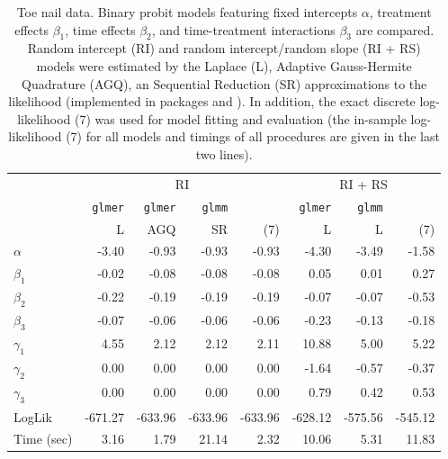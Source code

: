 \documentclass[article,nojss,shortnames]{jss}\usepackage[]{graphicx}\usepackage[]{xcolor}
\newcommand{\eshiftparm}{\beta}
\begin{document}
\begin{table}
\begin{center}


\begin{tabular}{lrrrr|rrr} \\ \hline
& \multicolumn{4}{c|}{RI} & \multicolumn{3}{c}{RI + RS} \\
& \texttt{glmer} & \texttt{glmer} & \texttt{glmm} &  & \texttt{glmer} & \texttt{glmm} & \\
& L               & AGQ             & SR & (7) & L & L & (7) \\ \hline
$\alpha$ & -3.40 & -0.93 & -0.93 & -0.93 & -4.30 & -3.49 & -1.58
\\
$\eshiftparm_1$ & -0.02 & -0.08 & -0.08 & -0.08 &  0.05 &  0.01 &  0.27
\\
$\eshiftparm_2$ & -0.22 & -0.19 & -0.19 & -0.19 & -0.07 & -0.07 & -0.53
\\
$\eshiftparm_3$ & -0.07 & -0.06 & -0.06 & -0.06 & -0.23 & -0.13 & -0.18
\\
$\gamma_1$ &  4.55 &  2.12 &  2.12 &  2.11 & 10.88 &  5.00 &  5.22
\\
$\gamma_2$ &  0.00 &  0.00 &  0.00 &  0.00 & -1.64 & -0.57 & -0.37
\\
$\gamma_3$ &  0.00 &  0.00 &  0.00 &  0.00 &  0.79 &  0.42 &  0.53
\\
\hline
LogLik & -671.27&-633.96&-633.96&-633.96&-628.12&-575.56&-545.12 \\ 
Time (sec)   &  3.16& 1.79&21.14& 2.32&10.06& 5.31&11.83 \\ \hline
\end{tabular}

\caption{Toe nail data. Binary probit models featuring fixed intercepts
$\alpha$, treatment effects $\eshiftparm_1$, time effects $\eshiftparm_2$,
and time-treatment interactions $\eshiftparm_3$ are compared.
Random intercept (RI) and
random intercept/random slope (RI + RS) models were estimated by the Laplace (L),
Adaptive Gauss-Hermite Quadrature (AGQ), an Sequential
Reduction (SR) approximations to the likelihood (implemented in packages
 and ). In addition, the exact discrete
log-likelihood (7) was used for model fitting and evaluation (the
in-sample log-likelihood (7) for all models and timings
of all procedures are given in the last two lines).
\label{tab:toenail}
}
\end{center}
\end{table}
\end{document}
